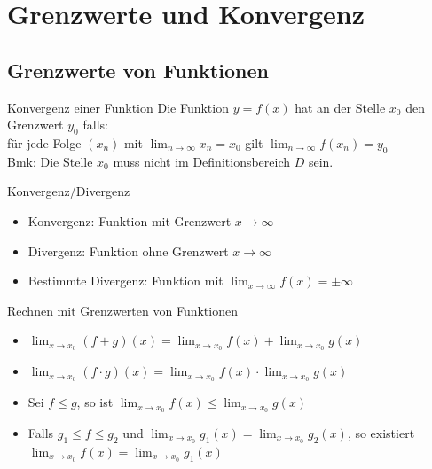 \section{Grenzwerte und Konvergenz}

\subsection{Grenzwerte von Funktionen}

\begin{definition}{Konvergenz einer Funktion}
    Die Funktion $y = f(x)$ hat an der Stelle $x_0$ den Grenzwert $y_0$ falls:\\
    für jede Folge $\left(x_{n}\right)$ mit $\lim _{n \rightarrow \infty} x_{n}=x_{0}$ gilt $\lim _{n \rightarrow \infty} f\left(x_{n}\right)=y_{0}$\\
    Bmk: Die Stelle $x_{0}$ muss nicht im Definitionsbereich $D$ sein.
\end{definition}

\begin{concept}{Konvergenz/Divergenz}
    \begin{itemize}
        \item Konvergenz:
        Funktion mit Grenzwert $x \rightarrow \infty$
        \item Divergenz:
        Funktion ohne Grenzwert $x \rightarrow \infty$
        \item Bestimmte Divergenz:
        Funktion mit $\lim _{x \rightarrow \infty} f(x)= \pm \infty$
    \end{itemize}
\end{concept}

\begin{theorem}{Rechnen mit Grenzwerten von Funktionen}
    \begin{itemize}
        \item $\lim_{x \to x_0} (f + g)(x) = \lim_{x \to x_0} f(x) + \lim_{x \to x_0} g(x)$
        \item $\lim_{x \to x_0} (f \cdot g)(x) = \lim_{x \to x_0} f(x) \cdot \lim_{x \to x_0} g(x)$
        \item Sei $f \leq g$, so ist $\lim_{x \to x_0} f(x) \leq \lim_{x \to x_0} g(x)$
        \item Falls $g_1 \leq f \leq g_2$ und $\lim_{x \to x_0} g_1(x) = \lim_{x \to x_0} g_2(x)$, so existiert $\lim_{x \to x_0} f(x) = \lim_{x \to x_0} g_1(x)$
    \end{itemize}
\end{theorem}

